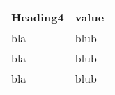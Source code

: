 \begin{tabular}[t]{ll}
Heading4 & value \\
\midrule
bla & blub \\
bla & blub \\
bla & blub \\
\end{tabular}